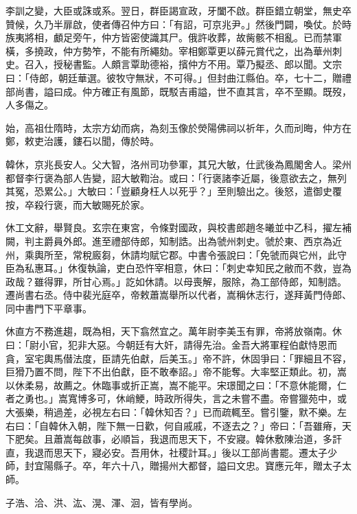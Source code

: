\begin{pinyinscope}
 李訓之變，大臣或誅或系。翌日，群臣謁宣政，牙闔不啟。群臣錯立朝堂，無史卒贊候，久乃半扉啟，使者傳召仲方曰：「有詔，可京兆尹。」然後門闢，喚仗。於時族夷將相，顱足旁午，仲方皆密使識其尸。俄許收葬，故胔骸不相亂。已而禁軍橫，多撓政，仲方勢笮，不能有所繩劾。宰相鄭覃更以薛元賞代之，出為華州刺史。召入，授秘書監。人頗言覃助德裕，擯仲方不用。覃乃擬丞、郎以聞。文宗曰：「侍郎，朝廷華選。彼牧守無狀，不可得。」但封曲江縣伯。卒，七十二，贈禮部尚書，謚曰成。仲方確正有風節，既駁吉甫謚，世不直其言，卒不至顯。既歿，人多傷之。



 始，高祖仕隋時，太宗方幼而病，為刻玉像於熒陽佛祠以祈年，久而刓晦，仲方在鄭，敕吏治護，鏤石以聞，傳於時。



 韓休，京兆長安人。父大智，洛州司功參軍，其兄大敏，仕武後為鳳閣舍人。梁州都督李行褒為部人告變，詔大敏鞫治。或曰：「行褒諸李近屬，後意欲去之，無列其冤，恐累公。」大敏曰：「豈顧身枉人以死乎？」至則驗出之。後怒，遣御史覆按，卒殺行褒，而大敏賜死於家。



 休工文辭，舉賢良。玄宗在東宮，令條對國政，與校書郎趙冬曦並中乙科，擢左補闕，判主爵員外郎。進至禮部侍郎，知制誥。出為虢州刺史。虢於東、西京為近州，乘輿所至，常稅廄芻，休請均賦它郡。中書令張說曰：「免虢而與它州，此守臣為私惠耳。」休復執論，吏白恐忤宰相意，休曰：「刺史幸知民之敝而不救，豈為政哉？雖得罪，所甘心焉。」訖如休請。以母喪解，服除，為工部侍郎，知制誥。遷尚書右丞。侍中裴光庭卒，帝敕蕭嵩舉所以代者，嵩稱休志行，遂拜黃門侍郎、同中書門下平章事。



 休直方不務進趨，既為相，天下翕然宜之。萬年尉李美玉有罪，帝將放嶺南。休曰：「尉小官，犯非大惡。今朝廷有大奸，請得先治。金吾大將軍程伯獻恃恩而貪，室宅輿馬僣法度，臣請先伯獻，后美玉。」帝不許，休固爭曰：「罪細且不容，巨猾乃置不問，陛下不出伯獻，臣不敢奉詔。」帝不能奪。大率堅正類此。初，嵩以休柔易，故薦之。休臨事或折正嵩，嵩不能平。宋璟聞之曰：「不意休能爾，仁者之勇也。」嵩寬博多可，休峭鯁，時政所得失，言之未嘗不盡。帝嘗獵苑中，或大張樂，稍過差，必視左右曰：「韓休知否？」已而疏輒至。嘗引鑒，默不樂。左右曰：「自韓休入朝，陛下無一日歡，何自戚戚，不逐去之？」帝曰：「吾雖瘠，天下肥矣。且蕭嵩每啟事，必順旨，我退而思天下，不安寢。韓休敷陳治道，多訐直，我退而思天下，寢必安。吾用休，社稷計耳。」後以工部尚書罷。遷太子少師，封宜陽縣子。卒，年六十八，贈揚州大都督，謚曰文忠。寶應元年，贈太子太師。



 子浩、洽、洪、汯、滉、渾、洄，皆有學尚。




\end{pinyinscope}
